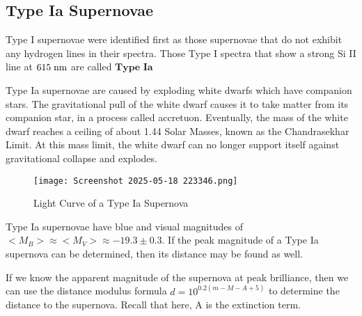 \documentclass{article}
\theoremstyle{definition}
\begin{document}
\subsection{Type Ia Supernovae}
\begin{definition}
Type I supernovae were identified first as those supernovae that do not exhibit any hydrogen lines in their spectra. Those Type I spectra that show a strong Si II line at $615\hspace{0.1cm}\text{nm}$ are called $\textbf{Type Ia}$
\end{definition}
\begin{note}
    Type Ia supernovae are caused by exploding white dwarfs which have companion stars. The gravitational pull of the white dwarf causes it to take matter from its companion star, in a process called accretuon. Eventually, the mass of the white dwarf reaches a ceiling of about 1.44 Solar Masses, known as the Chandrasekhar Limit. At this mass limit, the white dwarf can no longer support itself against gravitational collapse and explodes. 
\end{note}
\begin{figure}[H]
    \centering
    \texttt{[image: Screenshot 2025-05-18 223346.png]}
    \caption{Light Curve of a Type Ia Supernova}
\end{figure}
\begin{note}
    Type Ia supernovae have blue and visual magnitudes of $\big<M_B\big>\approx\big<M_V\big>\approx -19.3\pm0.3$. If the peak magnitude of a Type Ia supernova can be determined, then its distance may be found as well.
\end{note}
\begin{note}
    If we know the apparent magnitude of the supernova at peak brilliance, then we can use the distance modulus formula $d=10^{0.2(m-M-A+5)}$ to determine the distance to the supernova. Recall that here, A is the extinction term.
\end{note}
\end{document}
